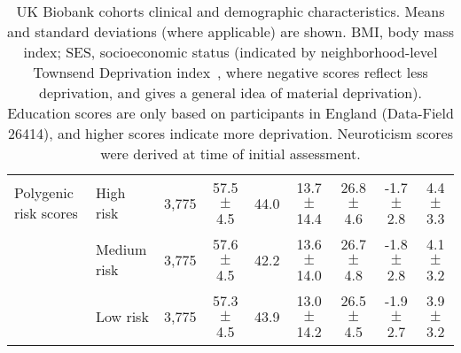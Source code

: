 \begin{table*}[t]
{\begin{tabular}{ l | l | c | c | c | c | c | c | c}
        Polygenic risk scores               & High risk         & 3,775         & 57.5 $\pm$ 4.5    & 44.0              & 13.7 $\pm$ 14.4     & 26.8 $\pm$ 4.6    & -1.7 $\pm$ 2.8    & 4.4 $\pm$ 3.3 \\
                                            & Medium risk       & 3,775         & 57.6 $\pm$ 4.5    & 42.2              & 13.6 $\pm$ 14.0     & 26.7 $\pm$ 4.8    & -1.8 $\pm$ 2.8    & 4.1 $\pm$ 3.2 \\
                                            & Low risk          & 3,775         & 57.3 $\pm$ 4.5    & 43.9              & 13.0 $\pm$ 14.2     & 26.5 $\pm$ 4.5    & -1.9 $\pm$ 2.7    & 3.9 $\pm$ 3.2 \\
        \bottomrule
    \end{tabular}
  }
\caption{
    UK Biobank cohorts clinical and demographic characteristics.
    Means and standard deviations (where applicable) are shown.
    BMI, body mass index; SES, socioeconomic status (indicated by neighborhood-level Townsend Deprivation index~\parencite{Townsend1987}, where negative scores reflect less deprivation, and gives a general idea of material deprivation).
    Education scores are only based on participants in England (Data-Field 26414), and higher scores indicate more deprivation.
    Neuroticism scores were derived at time of initial assessment.
}
\label{tab:ukbiobank-cohorts}
\end{table*}
